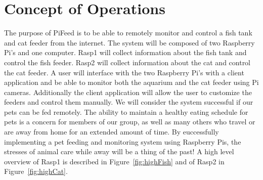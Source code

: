 




\usepackage[compact]{titlesec}

\usepackage{pifont}
\newcommand{\cmark}{\ding{51}}%
\newcommand{\xmark}{\ding{55}}%





\section{Concept of Operations}
The purpose of PiFeed is to be able to remotely monitor and control a fish tank
and cat feeder from the internet. The system will be composed of two
Raspberry Pi's and one computer. Rasp1 will collect information about the fish
tank and control the fish feeder. Rasp2 will collect information about the cat
and control the cat feeder. A user will interface with the two Raspberry Pi's
with a client application and be able to monitor both the aquarium and the cat
feeder using Pi cameras. Additionally the client application will allow the user
to customize the feeders and control them manually. We will consider the system
successful if our pets can be fed remotely. The ability to maintain a healthy
eating schedule for pets is a concern for members of our group, as well as many
others who travel or are away from home for an extended amount of time. By
euccessfully implementing a pet feeding and monitoring system using Raspberry
Pis, the stresses of animal care while away will be a thing of the past! A
high level overview of Rasp1 is described in Figure~\ref{fig:highFish} and of
Rasp2 in Figure~\ref{fig:highCat}.

